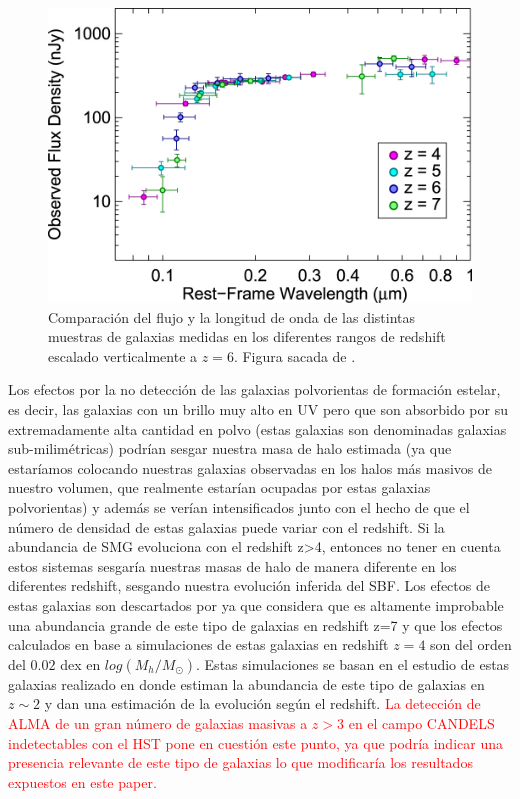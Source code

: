 \begin{figure}[t]
\begin{center}
\includegraphics[scale=1]{Figuras/sed_finkelstein}
\caption{\label{fig:sed_finkelstein} Comparación del flujo y la longitud de onda de las distintas muestras de galaxias medidas en los diferentes rangos de redshift escalado verticalmente a $z=6$. Figura sacada de \cite{finkelstein2015increasing}.}
\end{center}
\end{figure}

Los efectos por la no detección de las galaxias polvorientas de formación estelar, es decir, las galaxias con un brillo muy alto en UV pero que son absorbido por su extremadamente alta cantidad en polvo (estas galaxias son denominadas galaxias sub-milimétricas) podrían sesgar nuestra masa de halo estimada (ya que estaríamos colocando nuestras galaxias observadas en los halos más masivos de nuestro volumen, que realmente estarían ocupadas por estas galaxias polvorientas) y además se verían intensificados junto con el hecho de que el número de densidad de estas galaxias puede variar con el redshift. Si la abundancia de SMG evoluciona con el redshift z>4, entonces no tener en cuenta estos sistemas sesgaría nuestras masas de halo de manera diferente en los diferentes redshift, sesgando nuestra evolución inferida del SBF. Los efectos de estas galaxias son descartados por \cite{finkelstein2015increasing}ya que considera que es altamente improbable una abundancia grande de este tipo de galaxias en redshift z=7 y que los efectos calculados en base a simulaciones de estas galaxias en redshift $z=4$ son del orden del $0.02$ dex en $log(M_h/M_\odot)$. Estas simulaciones se basan en el estudio de estas galaxias realizado en \cite{casey2014dusty} donde estiman la abundancia de este tipo de galaxias en $z\sim 2$ y dan una estimación de la evolución según el redshift. \textcolor{red}{La detección de ALMA de un gran número de galaxias masivas a $z>3$ en el campo CANDELS \citep{wang2019dominant} indetectables con el HST pone en cuestión este punto, ya que podría indicar una presencia relevante de este tipo de galaxias lo que modificaría los resultados expuestos en este paper.}\\

